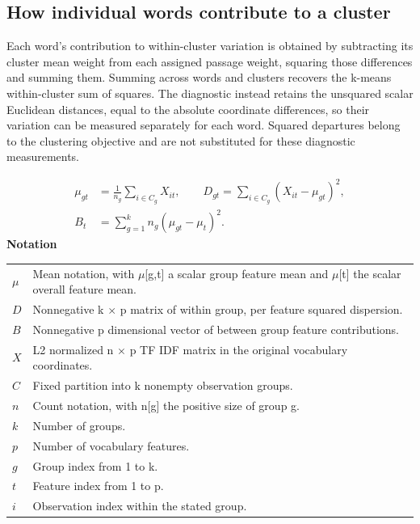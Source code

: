 \documentclass[10pt,letterpaper]{article}
\newcommand{\notlabel}{\noindent\textbf{Notation}\par\nobreak\vspace{4pt}}
\begin{document}
\subsection{How individual words contribute to a cluster}
Each word's contribution to within-cluster variation is obtained by subtracting its cluster mean weight from each assigned passage weight, squaring those differences and summing them. Summing across words and clusters recovers the k-means within-cluster sum of squares. The diagnostic instead retains the unsquared scalar Euclidean distances, equal to the absolute coordinate differences, so their variation can be measured separately for each word. Squared departures belong to the clustering objective and are not substituted for these diagnostic measurements.\par

\par\noindent\begin{minipage}{\linewidth}
\begin{equation}\label{eq:featurestats}
\begin{aligned}\mu_{gt}&=\frac1{n_g}\sum_{i\in C_g}X_{it},\qquad D_{gt}=\sum_{i\in C_g}(X_{it}-\mu_{gt})^2,\\B_t&=\sum_{g=1}^{k}n_g(\mu_{gt}-\mu_t)^2.\end{aligned}
\end{equation}
\notlabel
{\fontsize{8.5}{10.5}\selectfont\setlength{\tabcolsep}{0pt}\renewcommand{\arraystretch}{1.12}
\begin{tabularx}{\linewidth}{@{}p{.14\linewidth}X@{}}
$\mu$ & Mean notation, with \ensuremath{\mu}[g,t] a scalar group feature mean and \ensuremath{\mu}[t] the scalar overall feature mean.\\
$D$ & Nonnegative k \ensuremath{\times} p matrix of within group, per feature squared dispersion.\\
$B$ & Nonnegative p dimensional vector of between group feature contributions.\\
$X$ & L2 normalized n \ensuremath{\times} p TF IDF matrix in the original vocabulary coordinates.\\
$C$ & Fixed partition into k nonempty observation groups.\\
$n$ & Count notation, with n[g] the positive size of group g.\\
$k$ & Number of groups.\\
$p$ & Number of vocabulary features.\\
$g$ & Group index from 1 to k.\\
$t$ & Feature index from 1 to p.\\
$i$ & Observation index within the stated group.\\
\end{tabularx}}
\par\vspace{2pt}
\end{minipage}\par
\end{document}
